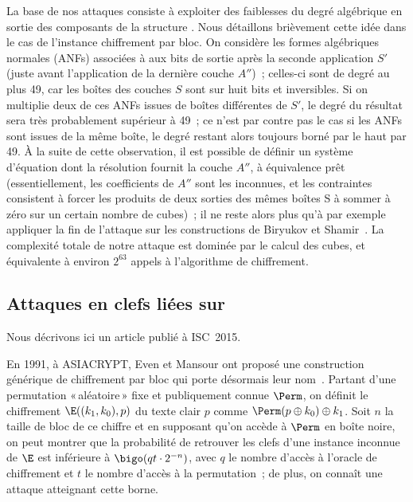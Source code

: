 La base de nos attaques consiste à exploiter des faiblesses du degré algébrique en sortie des composants de la structure \asasa. Nous détaillons brièvement cette idée dans le cas de l'instance
chiffrement par bloc. On considère les formes algébriques normales (ANFs) associées à aux bits de sortie après la seconde application $S'$ (juste avant l'application de la dernière couche $A''$)~;
celles-ci sont de degré au plus 49, car les boîtes des couches $S$ sont sur huit bits et inversibles. Si on multiplie deux de ces ANFs issues de boîtes différentes de $S'$, le degré du résultat
sera très probablement supérieur à 49~; ce n'est par contre pas le cas si les ANFs sont issues de la même boîte, le degré restant alors toujours borné par le haut par 49.
À la suite de cette observation, il est possible de définir un système d'équation dont la résolution fournit la couche $A''$, à équivalence prêt (essentiellement,
les coefficients de $A''$ sont les inconnues, et les contraintes consistent à forcer les produits de deux sorties des mêmes boîtes S à sommer à zéro sur un certain nombre de cubes)~; il ne reste alors plus qu'à par exemple
appliquer la fin de l'attaque sur les constructions \sasas de Biryukov et Shamir~\cite{DBLP:conf/eurocrypt/BiryukovS01}. La complexité totale de notre attaque est dominée par le calcul
des cubes, et équivalente à environ $2^{63}$ appels à l'algorithme de chiffrement.

\subsection{Attaques en clefs liées sur \proestotr \cite{DBLP:conf/isw/Karpman15}}

Nous décrivons ici un article publié à ISC~2015.

\medskip

En 1991, à ASIACRYPT, Even et Mansour ont proposé une construction générique de chiffrement par bloc qui porte désormais leur nom~\cite{EM}. Partant d'une permutation «\,aléatoire\,» fixe
et publiquement connue $\Perm$, on définit le chiffrement $\E((k_1,k_0),p)$ du texte clair $p$ comme $\Perm(p \oplus k_0) \oplus k_1$. Soit $n$ la taille de bloc de ce chiffre
et en supposant qu'on accède à $\Perm$ en boîte noire, on peut montrer que la probabilité de retrouver les clefs d'une instance inconnue de $\E$ est inférieure à
$\bigo(qt \cdot 2^{-n})$, avec $q$ le nombre d'accès à l'oracle de chiffrement et $t$ le nombre d'accès à la permutation~; de plus, on connaît une attaque atteignant cette borne.

